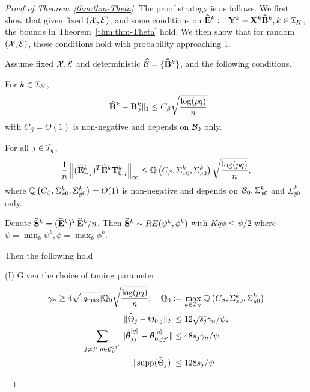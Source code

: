 \begin{proof}[Proof of Theorem~\ref{thm:thm-Theta}]
The proof strategy is as follows. We first show that given fixed $({\cal{X}},{\cal{E}})$, and some conditions on $\widehat {{\mathbf{E}}}^k := {\mathbf{Y}}^k - {\mathbf{X}}^k \widehat {{\mathbf{B}}}^k, k \in {\cal{I}}_K$, the bounds in Theorem~\ref{thm:thm-Theta} hold. We then show that for random $({\cal{X}},{\cal{E}})$, those conditions hold with probability approaching 1.

\begin{Lemma}\label{thm:ThetaThm}
Assume fixed ${\cal{X}}, {\cal{E}}$ and deterministic $\widehat {{\cal{B}}} = \{ \widehat {{\mathbf{B}}}^k \}$, and the following conditions.

 For $k \in {\cal{I}}_K$,
%
$$
\| \widehat {{\mathbf{B}}}^k - {\mathbf{B}}^k_0 \|_1 \leq C_\beta \sqrt{\frac{\log (pq)}{n}}
$$
%
with $C_\beta = O(1)$ is non-negative and depends on ${\cal{B}}_0$ only.


 For all $j \in {\cal{I}}_q$,
%
$$
\frac{1}{n} \left\| (\widehat {{\mathbf{E}}}_{-j}^k)^T \widehat {{\mathbf{E}}}^k {\mathbf{T}}_{0,j}^k \right\|_\infty \leq
{\mathbb{Q}} \left(C_\beta, \Sigma_{x0}^k, \Sigma_{y0}^k \right) \sqrt {\frac{ \log (p q)}{n}},
$$
%
where ${\mathbb{Q}} \left(C_\beta, \Sigma_{x0}^k, \Sigma_{y0}^k \right) = O(1)$ is non-negative and depends on ${\cal{B}}_0, \Sigma_{x0}^k$ and $\Sigma_{y0}^k$ only.

 Denote $\widehat {{\mathbf{S}}}^k = (\widehat {{\mathbf{E}}}^k)^T \widehat {{\mathbf{E}}}^k/n$. Then $\widehat {{\mathbf{S}}}^k \sim RE(\psi^k, \phi^k)$ with $Kq \phi \leq \psi/2$ where $ \psi = \min_k \psi^k, \phi = \max_k \phi^k $.


Then the following hold

\noindent (I) Given the choice of tuning parameter
%
$$
\gamma_n \geq 4 \sqrt{| g_{\max}|} {\mathbb{Q}}_0 \sqrt {\frac{ \log (p q)}{n}}; \quad
{\mathbb{Q}}_0 := \max_{k \in {\cal{I}}_K} {\mathbb{Q}} \left(C_\beta, \Sigma_{x0}^k, \Sigma_{y0}^k  \right)
$$
%
\begin{align}
\| \widehat \Theta_j - \Theta_{0,j} \|_F & \leq 12 \sqrt{s_j} \gamma_n / \psi, \label{eqn:theta-norm-bound-1a}\\
\sum_{j \neq j', g \in {\cal{G}}_y^{jj'}} \| \hat {{\boldsymbol{\theta}}}_{jj'}^{[g]} - {\boldsymbol{\theta}}_{0,jj'}^{[g]} \| & \leq 48 s_j \gamma_n / \psi. \label{eqn:theta-norm-bound-2a}\\
| \operatorname*{supp} (\widehat \Theta_j) | & \leq 128 s_j / \psi
\end{align}
%


\end{Lemma}
\end{proof}
